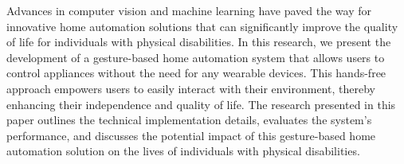 Advances in computer vision and machine learning have paved the way for innovative home automation solutions that can significantly improve the quality of life for individuals with physical disabilities. In this research, we present the development of a gesture-based home automation system that allows users to control appliances without the need for any wearable devices. This hands-free approach empowers users to easily interact with their environment, thereby enhancing their independence and quality of life. The research presented in this paper outlines the technical implementation details, evaluates the system's performance, and discusses the potential impact of this gesture-based home automation solution on the lives of individuals with physical disabilities.

